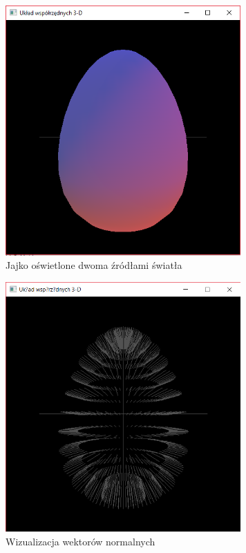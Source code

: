 \documentclass[12pt,a4paper,titlepage]{article}
\begin{document}
\begin{figure}[H]
\centering
\includegraphics[width = 9cm]{images/egg_light.png}
\caption{Jajko oświetlone dwoma źródłami światła}
\label{fig:eggWithLight}
\end{figure}

\begin{figure}[H]
\centering
\includegraphics[width = 9cm]{images/egg_vectors.png}
\caption{Wizualizacja wektorów normalnych}
\label{fig:eggWithVectors}
\end{figure}
\end{document}
